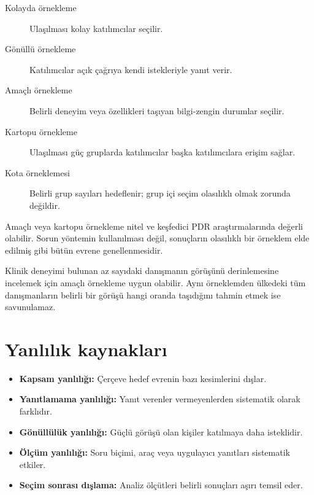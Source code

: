 \begin{description}
  \item[Kolayda örnekleme] Ulaşılması kolay katılımcılar seçilir.
  \item[Gönüllü örnekleme] Katılımcılar açık çağrıya kendi istekleriyle yanıt verir.
  \item[Amaçlı örnekleme] Belirli deneyim veya özellikleri taşıyan bilgi-zengin durumlar seçilir.
  \item[Kartopu örnekleme] Ulaşılması güç gruplarda katılımcılar başka katılımcılara erişim sağlar.
  \item[Kota örneklemesi] Belirli grup sayıları hedeflenir; grup içi seçim olasılıklı olmak zorunda değildir.
\end{description}

Amaçlı veya kartopu örnekleme nitel ve keşfedici PDR araştırmalarında değerli
olabilir. Sorun yöntemin kullanılması değil, sonuçların olasılıklı bir örneklem
elde edilmiş gibi bütün evrene genellenmesidir.

\begin{researchbox}
Klinik deneyimi bulunan az sayıdaki danışmanın görüşünü derinlemesine
incelemek için amaçlı örnekleme uygun olabilir. Aynı örneklemden ülkedeki tüm
danışmanların belirli bir görüşü hangi oranda taşıdığını tahmin etmek ise
savunulamaz.
\end{researchbox}

\section{Yanlılık kaynakları}

\begin{itemize}
  \item \textbf{Kapsam yanlılığı:} Çerçeve hedef evrenin bazı kesimlerini dışlar.
  \item \textbf{Yanıtlamama yanlılığı:} Yanıt verenler vermeyenlerden sistematik olarak farklıdır.
  \item \textbf{Gönüllülük yanlılığı:} Güçlü görüşü olan kişiler katılmaya daha isteklidir.
  \item \textbf{Ölçüm yanlılığı:} Soru biçimi, araç veya uygulayıcı yanıtları sistematik etkiler.
  \item \textbf{Seçim sonrası dışlama:} Analiz ölçütleri belirli sonuçları aşırı temsil eder.
\end{itemize}


